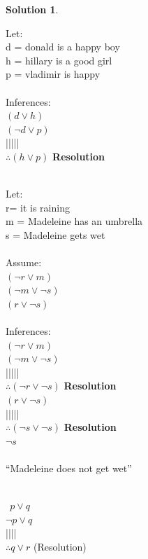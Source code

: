 \documentclass{article}
\theoremstyle{definition}
\newtheorem*{solution}{Solution}
\begin{document}
\begin{solution}\ \\
\begin{compactenum}
\item Let: \ \\
\indent d = donald is a happy boy\ \\
\indent h = hillary is a good girl\ \\
\indent p = vladimir is happy\ \\ \ \\
\indent Inferences:\ \\
\indent $(d \vee h)$\ \\
\indent $(\neg d \vee p)$\ \\
||||| \ \\
$\therefore (h \vee p)$ \textbf{Resolution}\ \\
\ \\
\item Let: \ \\
r= it is raining\ \\
m = Madeleine has an umbrella\ \\
s = Madeleine gets wet\ \\
\ \\
Assume:\ \\
$(\neg r \vee m)$\ \\
$(\neg m \vee \neg s)$\ \\
$(r \vee \neg s)$\ \\
\ \\
Inferences: \ \\
$(\neg r \vee m)$\ \\
$(\neg m \vee \neg s)$\ \\
|||||\ \\
$\therefore(\neg r \vee \neg s)$ \textbf{Resolution}\ \\
$(r \vee \neg s)$\ \\
|||||\ \\
$\therefore(\neg s \vee \neg s)$ \textbf{Resolution}\ \\
$\neg s$ \ \\ \ \\
``Madeleine does not get wet''\ \\ \ \\
\item
$\ \ p \vee q$\ \\
$\neg p \vee q$\ \\
||||\ \\
$\therefore q \vee r$ (Resolution)\ \\

\end{compactenum}
\end{solution}
\end{document}

